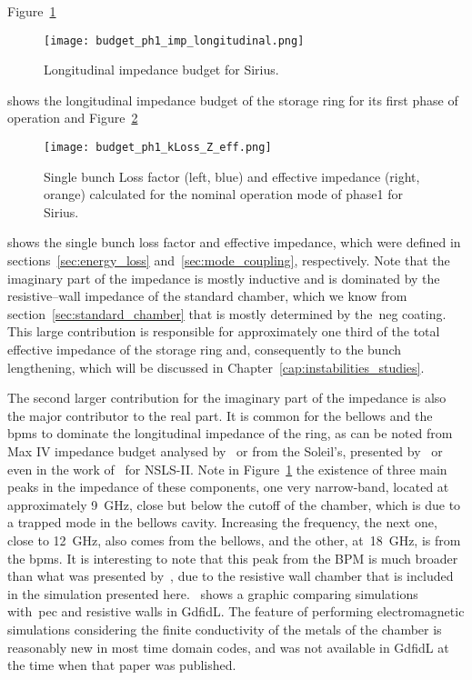     Figure~\ref{fig:long_imp_budget}
    \begin{figure}
        \centering
        \texttt{[image: budget\_ph1\_imp\_longitudinal.png]}
        \caption{Longitudinal impedance budget for Sirius.}
        \label{fig:long_imp_budget}
    \end{figure}
    shows the longitudinal impedance budget of the storage ring for its first phase of operation and Figure~\ref{fig:ph1_kLoss_Z_eff}
    \begin{figure}
        \centering
        \texttt{[image: budget\_ph1\_kLoss\_Z\_eff.png]}
        \caption{Single bunch Loss factor (left, blue) and effective impedance (right, orange) calculated for the nominal operation mode of phase1 for Sirius.}
        \label{fig:ph1_kLoss_Z_eff}
    \end{figure}
    shows the single bunch loss factor and effective impedance, which were defined in sections~\ref{sec:energy_loss} and~\ref{sec:mode_coupling}, respectively. Note that the imaginary part of the impedance is mostly inductive and is dominated by the resistive--wall impedance of the standard chamber, which we know from section~\ref{sec:standard_chamber} that is mostly determined by the~\gls{neg} coating. This large contribution is responsible for approximately one third of the total effective impedance of the storage ring and, consequently to the bunch lengthening, which will be discussed in Chapter~\ref{cap:instabilities_studies}.

    The second larger contribution for the imaginary part of the impedance is also the major contributor to the real part. It is common for the bellows and the \glspl{bpm} to dominate the longitudinal impedance of the ring, as can be noted from Max IV impedance budget analysed by~ or from the Soleil's, presented by~ or even in the work of~ for NSLS-II. Note in Figure~\ref{fig:long_imp_budget} the existence of three main peaks in the impedance of these components, one very narrow-band, located at approximately \SI{9}{\giga\hertz}, close but below the cutoff of the chamber,  which is due to a trapped mode in the bellows cavity. Increasing the frequency, the next one, close to \SI{12}{\giga\hertz}, also comes from the bellows, and the other, at~\SI{18}{\giga\hertz}, is from the \glspl{bpm}.
    It is interesting to note that this peak from the BPM is much broader than what was presented by~, due to the resistive wall chamber that is included in the simulation presented here.~ shows a graphic comparing simulations with~\gls{pec} and resistive walls in GdfidL. The feature of performing electromagnetic simulations considering the finite conductivity of the metals of the chamber is reasonably new in most time domain codes, and was not available in GdfidL at the time when that paper was published.

